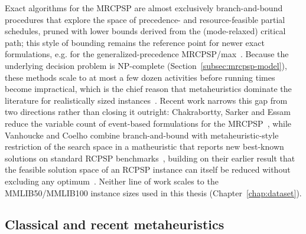 Exact algorithms for the MRCPSP are almost exclusively branch-and-bound
procedures that explore the space of precedence- and resource-feasible partial
schedules, pruned with lower bounds derived from the (mode-relaxed) critical
path; this style of bounding remains the reference point for newer exact
formulations, e.g. for the generalized-precedence
MRCPSP/max~\cite{bartusch1988}. Because the underlying decision problem is
NP-complete (Section~\ref{subsec:mrcpsp-model}), these methods scale to at most
a few dozen activities before running times become impractical, which is the
chief reason that metaheuristics dominate the literature for realistically sized
instances~\cite{demeulemeester2002,hartmann2010survey}. Recent work narrows
this gap from two directions rather than closing it outright: Chakrabortty,
Sarker and Essam reduce the variable count of event-based  formulations
for the MRCPSP~\cite{chakrabortty2014event}, while Vanhoucke and Coelho
combine branch-and-bound with metaheuristic-style restriction of the search
space in a matheuristic that reports new best-known solutions on standard
RCPSP benchmarks~\cite{vanhoucke2024matheuristic}, building on their earlier
result that the feasible solution space of an RCPSP instance can itself be
reduced without excluding any optimum~\cite{vanhoucke2024reducing}. Neither
line of work scales to the MMLIB50/MMLIB100 instance sizes used in this
thesis (Chapter~\ref{chap:dataset}).

\subsection{Classical and recent metaheuristics}
\label{subsec:metaheuristics}

